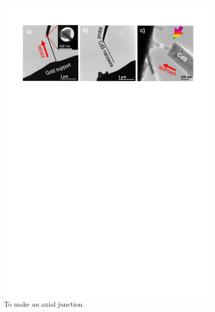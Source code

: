 \begin{figure}  
\includegraphics[width=\textwidth]{figures/figure3_1}
\caption[To make an axial junction.]{To make an axial junction.
\label{fig:fig3_1}}
\end{figure}

